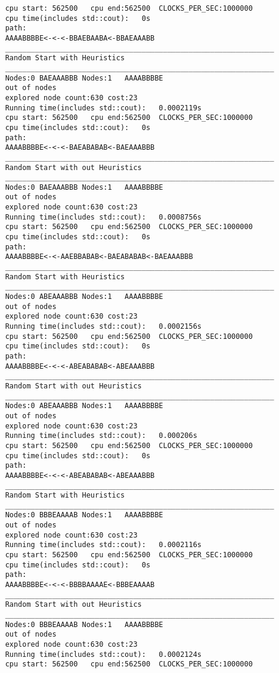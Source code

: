 \documentclass[12pt]{article}
\begin{document}
\begin{lstlisting}
	cpu start: 562500	cpu end:562500	CLOCKS_PER_SEC:1000000
	cpu time(includes std::cout):	0s
	path:
	AAAABBBBE<-<-<-BBAEBAABA<-BBAEAAABB
	_______________________________________________________________
	Random Start with Heuristics
	_______________________________________________________________
	Nodes:0	BAEAAABBB Nodes:1	AAAABBBBE
	out of nodes
	explored node count:630 cost:23
	Running time(includes std::cout):	0.0002119s
	cpu start: 562500	cpu end:562500	CLOCKS_PER_SEC:1000000
	cpu time(includes std::cout):	0s
	path:
	AAAABBBBE<-<-<-BAEABABAB<-BAEAAABBB
	_______________________________________________________________
	Random Start with out Heuristics
	_______________________________________________________________
	Nodes:0	BAEAAABBB Nodes:1	AAAABBBBE
	out of nodes
	explored node count:630 cost:23
	Running time(includes std::cout):	0.0008756s
	cpu start: 562500	cpu end:562500	CLOCKS_PER_SEC:1000000
	cpu time(includes std::cout):	0s
	path:
	AAAABBBBE<-<-AAEBBABAB<-BAEABABAB<-BAEAAABBB
	_______________________________________________________________
	Random Start with Heuristics
	_______________________________________________________________
	Nodes:0	ABEAAABBB Nodes:1	AAAABBBBE
	out of nodes
	explored node count:630 cost:23
	Running time(includes std::cout):	0.0002156s
	cpu start: 562500	cpu end:562500	CLOCKS_PER_SEC:1000000
	cpu time(includes std::cout):	0s
	path:
	AAAABBBBE<-<-<-ABEABABAB<-ABEAAABBB
	_______________________________________________________________
	Random Start with out Heuristics
	_______________________________________________________________
	Nodes:0	ABEAAABBB Nodes:1	AAAABBBBE
	out of nodes
	explored node count:630 cost:23
	Running time(includes std::cout):	0.000206s
	cpu start: 562500	cpu end:562500	CLOCKS_PER_SEC:1000000
	cpu time(includes std::cout):	0s
	path:
	AAAABBBBE<-<-<-ABEABABAB<-ABEAAABBB
	_______________________________________________________________
	Random Start with Heuristics
	_______________________________________________________________
	Nodes:0	BBBEAAAAB Nodes:1	AAAABBBBE
	out of nodes
	explored node count:630 cost:23
	Running time(includes std::cout):	0.0002116s
	cpu start: 562500	cpu end:562500	CLOCKS_PER_SEC:1000000
	cpu time(includes std::cout):	0s
	path:
	AAAABBBBE<-<-<-BBBBAAAAE<-BBBEAAAAB
	_______________________________________________________________
	Random Start with out Heuristics
	_______________________________________________________________
	Nodes:0	BBBEAAAAB Nodes:1	AAAABBBBE
	out of nodes
	explored node count:630 cost:23
	Running time(includes std::cout):	0.0002124s
	cpu start: 562500	cpu end:562500	CLOCKS_PER_SEC:1000000

\end{lstlisting}
\end{document}
